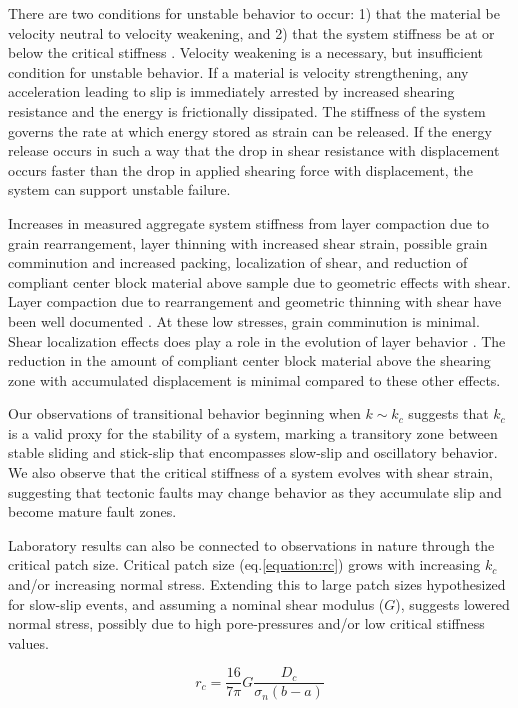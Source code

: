 \documentclass[11pt]{article}
\begin{document}
There are two conditions for unstable behavior to occur: 1) that the material be
velocity neutral to velocity weakening, and 2) that the system stiffness be at
or below the critical stiffness \cite{Marone:1998, Scholz:2002}. Velocity
weakening is a necessary, but insufficient condition for unstable behavior. If a
material is velocity strengthening, any acceleration leading to slip is
immediately arrested by increased shearing resistance and the energy is
frictionally dissipated. The stiffness of the system governs the rate at which
energy stored as strain can be released. If the energy release occurs in such a
way that the drop in shear resistance with displacement occurs faster than the
drop in applied shearing force with displacement, the system can support
unstable failure.

Increases in measured aggregate system stiffness from layer compaction due to
grain rearrangement, layer thinning with increased shear strain, possible grain
comminution and increased packing, localization of shear, and reduction of
compliant center block material above sample due to geometric effects with
shear. Layer compaction due to rearrangement and geometric thinning with shear
have been well documented \cite{Scott:1994}.  At these low stresses, grain
comminution is minimal. Shear localization effects does play a role in the
evolution of layer behavior \cite{Logan:1992}. The reduction in the amount of
compliant center block material above the shearing zone with accumulated
displacement is minimal compared to these other effects.

Our observations of transitional behavior beginning when $k \sim k_c$ suggests
that $k_c$ is a valid proxy for the stability of a system, marking a transitory
zone between stable sliding and stick-slip that encompasses slow-slip and
oscillatory behavior. We also observe that the critical stiffness of a system
evolves with shear strain, suggesting that tectonic faults may change behavior
as they accumulate slip and become mature fault zones.

Laboratory results can also be connected to observations in nature through the
critical patch size. Critical patch size (eq.\ref{equation:rc}) grows with
increasing $k_c$ and/or increasing normal stress. Extending this to large patch
sizes hypothesized for slow-slip events, and assuming a nominal shear modulus
($G$), suggests lowered normal stress, possibly due to high pore-pressures
and/or low critical stiffness values.

\begin{equation}
    r_c = \frac{16}{7\pi}G \frac{D_c}{\sigma_n (b-a)}
    \label{equation:rc}
\end{equation}
\end{document}
